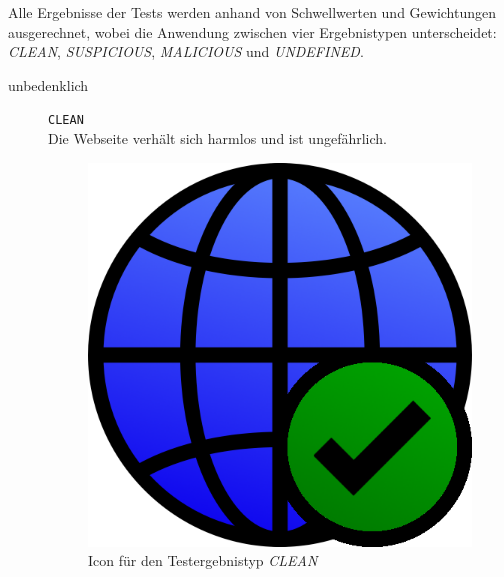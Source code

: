 Alle Ergebnisse der Tests werden anhand von Schwellwerten und Gewichtungen ausgerechnet, wobei die Anwendung zwischen vier Ergebnistypen unterscheidet: \textit{CLEAN}, \textit{SUSPICIOUS}, \textit{MALICIOUS} und \textit{UNDEFINED}.

\begin{description}
    \item[unbedenklich] \hfill \texttt{CLEAN} \\
    Die Webseite verhält sich harmlos und ist ungefährlich.
	\begin{figure}[H]
		\centering
		\includegraphics[scale=0.2]{images/webifier-clean}
		\caption{Icon für den Testergebnistyp \textit{CLEAN}}
	\end{figure}


\end{description}
